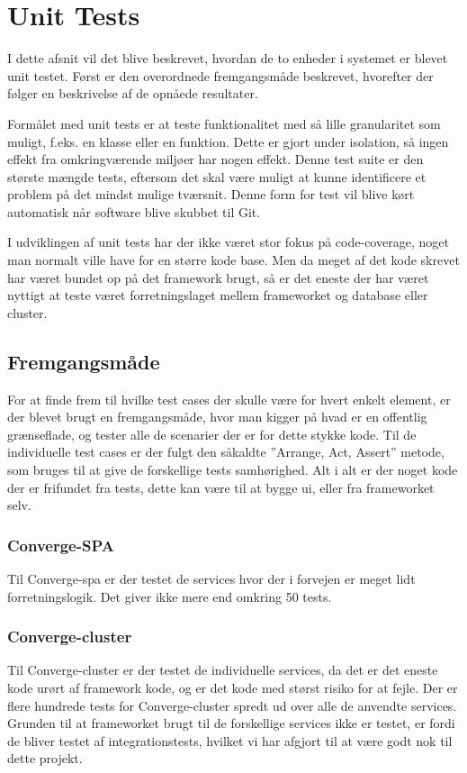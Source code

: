 
\section{Unit Tests}

I dette afsnit vil det blive beskrevet, hvordan de to enheder i systemet er blevet unit testet. Først er den overordnede fremgangsmåde beskrevet, hvorefter der følger en beskrivelse af de opnåede resultater.

Formålet med unit tests er at teste funktionalitet med så lille granularitet som muligt, f.eks. en klasse eller en funktion. Dette er gjort under isolation, så ingen effekt fra omkringværende miljøer har nogen effekt. Denne test suite er den største mængde tests, eftersom det skal være muligt at kunne identificere et problem på det mindst mulige tværsnit. Denne form for test vil blive kørt automatisk når software blive skubbet til Git.

I udviklingen af unit tests har der ikke været stor fokus på code-coverage, noget man normalt ville have for en større kode base. Men da meget af det kode skrevet har været bundet op på det framework brugt, så er det eneste der har været nyttigt at teste været forretningslaget mellem frameworket og database eller cluster.


\subsection{Fremgangsmåde}

For at finde frem til hvilke test cases der skulle være for hvert enkelt element, er der blevet brugt en fremgangsmåde, hvor man kigger på hvad er en offentlig grænseflade, og tester alle de scenarier der er for dette stykke kode. Til de individuelle test cases er der fulgt den såkaldte ''Arrange, Act, Assert'' \cite{Arrange-Act-Assert} metode, som bruges til at give de forskellige tests samhørighed. Alt i alt er der noget kode der er frifundet fra tests, dette kan være til at bygge ui, eller fra frameworket selv.


\subsubsection{Converge-SPA}

Til Converge-spa er der testet de services hvor der i forvejen er meget lidt forretningslogik. Det giver ikke mere end omkring 50 tests.

\subsubsection{Converge-cluster}

Til Converge-cluster er der testet de individuelle services, da det er det eneste kode urørt af framework kode, og er det kode med størst risiko for at fejle. Der er flere hundrede tests for Converge-cluster spredt ud over alle de anvendte services. Grunden til at frameworket brugt til de forskellige services ikke er testet, er fordi de bliver testet af integrationstests, hvilket vi har afgjort til at være godt nok til dette projekt.